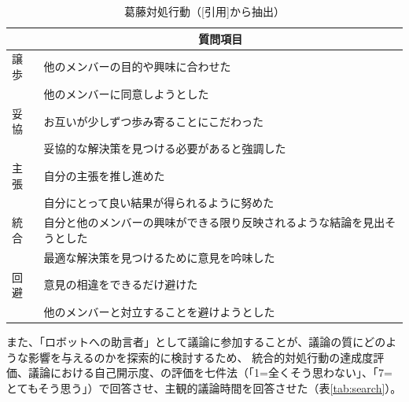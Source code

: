 \documentclass[11pt, a4paper]{jreport} %
\begin{document}
\begin{table}[H]
\caption{葛藤対処行動（{[}引用{]}から抽出）}
\centering
\label{tab:conflict_deal}
\begin{tabular}{@{}ll@{}}
\toprule
\multicolumn{1}{c}{} & \multicolumn{1}{c}{質問項目}             \\ \midrule
譲歩                   & 他のメンバーの目的や興味に合わせた                    \\
                     & 他のメンバーに同意しようとした                      \\
妥協                   & お互いが少しずつ歩み寄ることにこだわった                 \\
                     & 妥協的な解決策を見つける必要があると強調した               \\
主張                   & 自分の主張を推し進めた                          \\
                     & 自分にとって良い結果が得られるように努めた                \\
統合                   & 自分と他のメンバーの興味ができる限り反映されるような結論を見出そうとした \\
                     & 最適な解決策を見つけるために意見を吟味した                \\
回避                   & 意見の相違をできるだけ避けた                       \\
                     & 他のメンバーと対立することを避けようとした                \\ \bottomrule
\end{tabular}
\end{table}




また、「ロボットへの助言者」として議論に参加することが、議論の質にどのような影響を与えるのかを探索的に検討するため、
統合的対処行動の達成度評価、議論における自己開示度、の評価を七件法（「1=全くそう思わない」、「7=とてもそう思う」）で回答させ、主観的議論時間を回答させた（表\ref{tab:search}）。
\end{document}
